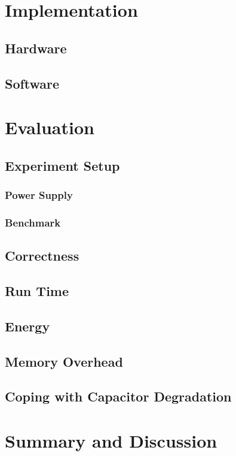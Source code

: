 \section{Implementation}
\subsection{Hardware}
\subsection{Software}

\section{Evaluation}
\subsection{Experiment Setup}
\subsubsection{Power Supply}
\subsubsection{Benchmark}
\subsection{Correctness}
\subsection{Run Time}
\subsection{Energy}
\subsection{Memory Overhead}
\subsection{Coping with Capacitor Degradation}

\section{Summary and Discussion}